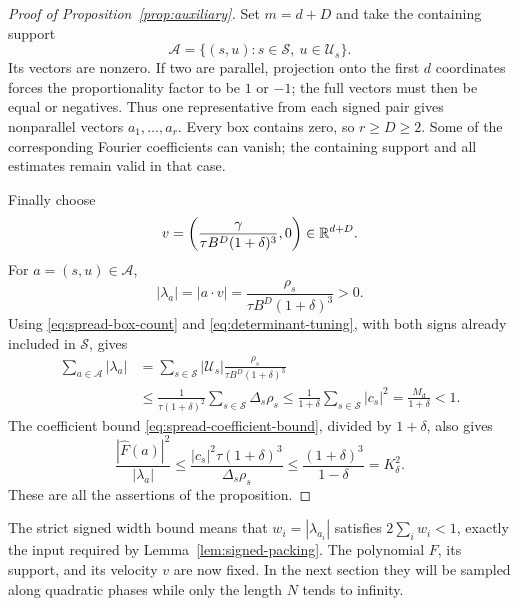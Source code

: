 \begin{proof}[Proof of Proposition~\ref{prop:auxiliary}]
Set $m=d+D$ and take the containing support
\[
 \mathcal A=\{(s,u):s\in\mathcal S,\ u\in\mathcal U_s\}.
\]
Its vectors are nonzero.  If two are parallel, projection onto the
first $d$ coordinates forces the proportionality factor to be $1$
or $-1$; the full vectors must then be equal or negatives.
Thus one representative from each signed pair gives nonparallel
vectors $a_1,\ldots,a_r$.  Every box contains zero, so $r\ge D\ge2$.
Some of the corresponding Fourier coefficients can vanish; the
containing support and all estimates remain valid in that case.

Finally choose
\[
 v=\left(\frac{\gamma}{\tau B^D(1+\delta)^3},0\right)\in\mathbb R^{d+D}.
\]
For $a=(s,u)\in\mathcal A$,
\[
 |\lambda_a|=|a\cdot v|
 =\frac{\rho_s}{\tau B^D(1+\delta)^3}>0.
\]
Using \eqref{eq:spread-box-count} and
\eqref{eq:determinant-tuning}, with both signs already included in
$\mathcal S$, gives
\begin{align*}
 \sum_{a\in\mathcal A}|\lambda_a|
 &=\sum_{s\in\mathcal S}|\mathcal U_s|
     \frac{\rho_s}{\tau B^D(1+\delta)^3}\\
 &\le\frac1{\tau(1+\delta)^2}\sum_{s\in\mathcal S}\Delta_s\rho_s
 \le\frac1{1+\delta}\sum_{s\in\mathcal S}|c_s|^2
 =\frac{M_d}{1+\delta}<1.
\end{align*}
The coefficient bound \eqref{eq:spread-coefficient-bound}, divided
by $1+\delta$, also gives
\[
 \frac{|\widehat F(a)|^2}{|\lambda_a|}
 \le\frac{|c_s|^2\tau(1+\delta)^3}{\Delta_s\rho_s}
 \le\frac{(1+\delta)^3}{1-\delta}=K_\delta^2.
\]
These are all the assertions of the proposition.
\end{proof}

The strict signed width bound means that
$w_i=|\lambda_{a_i}|$ satisfies $2\sum_iw_i<1$, exactly the input
required by Lemma~\ref{lem:signed-packing}.  The polynomial $F$, its
support, and its velocity $v$ are now fixed.  In the next section
they will be sampled along quadratic phases while only the length
$N$ tends to infinity.
